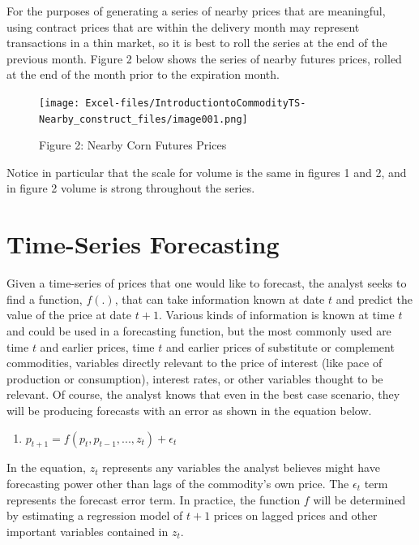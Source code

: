\documentclass[
  letterpaper,
  DIV=11,
  numbers=noendperiod]{scrreprt}
\providecommand{\tightlist}{%
  \setlength{\itemsep}{0pt}\setlength{\parskip}{0pt}}\usepackage{longtable,booktabs,array}
\begin{document}
For the purposes of generating a series of nearby prices that are
meaningful, using contract prices that are within the delivery month may
represent transactions in a thin market, so it is best to roll the
series at the end of the previous month. Figure 2 below shows the series
of nearby futures prices, rolled at the end of the month prior to the
expiration month.

\begin{figure}

{\centering \texttt{[image: Excel-files/IntroductiontoCommodityTS-Nearby\_construct\_files/image001.png]}

}

\caption{Figure 2: Nearby Corn Futures Prices}

\end{figure}

Notice in particular that the scale for volume is the same in figures 1
and 2, and in figure 2 volume is strong throughout the series.

\hypertarget{time-series-forecasting}{%
\section{Time-Series Forecasting}\label{time-series-forecasting}}

Given a time-series of prices that one would like to forecast, the
analyst seeks to find a function, \(f(.)\), that can take information
known at date \(t\) and predict the value of the price at date \(t+1\).
Various kinds of information is known at time \(t\) and could be used in
a forecasting function, but the most commonly used are time \(t\) and
earlier prices, time \(t\) and earlier prices of substitute or
complement commodities, variables directly relevant to the price of
interest (like pace of production or consumption), interest rates, or
other variables thought to be relevant. Of course, the analyst knows
that even in the best case scenario, they will be producing forecasts
with an error as shown in the equation below.

\begin{enumerate}
\def\labelenumi{(\arabic{enumi})}
\tightlist
\item
  \(p_{t+1} = f(p_t, p_{t-1}, ..., z_t) + \epsilon_t\)
\end{enumerate}

In the equation, \(z_t\) represents any variables the analyst believes
might have forecasting power other than lags of the commodity's own
price. The \(\epsilon_t\) term represents the forecast error term. In
practice, the function \(f\) will be determined by estimating a
regression model of \(t+1\) prices on lagged prices and other important
variables contained in \(z_t\).
\end{document}
